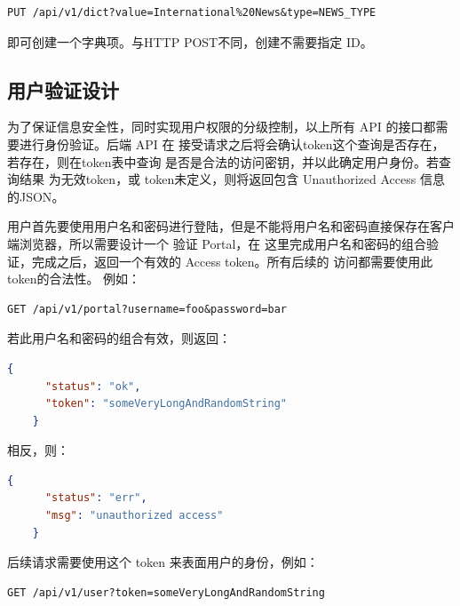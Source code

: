 \documentclass[a4paper, 12pt]{article}
\begin{document}
	\begin{lstlisting}[language=HTTP, basicstyle=\small\lstfont, showstringspaces=false]
	PUT /api/v1/dict?value=International%20News&type=NEWS_TYPE
	\end{lstlisting}

	即可创建一个字典项。与{\inlinecode HTTP POST}不同，创建不需要指定 ID。

	\subsection{\normalfont 用户验证设计}

	为了保证信息安全性，同时实现用户权限的分级控制，以上所有 API 的接口都需要进行身份验证。后端 API 在
	接受请求之后将会确认{\inlinecode token}这个查询是否存在，若存在，则在{\inlinecode token}表中查询
	是否是合法的访问密钥，并以此确定用户身份。若查询结果 为无效{\inlinecode token}，或
	{\inlinecode token}未定义，则将返回包含 Unauthorized Access 信息的{\inlinecode JSON}。

	用户首先要使用用户名和密码进行登陆，但是不能将用户名和密码直接保存在客户端浏览器，所以需要设计一个
	验证 Portal，在 这里完成用户名和密码的组合验证，完成之后，返回一个有效的 Access token。所有后续的
	访问都需要使用此{\inlinecode token}的合法性。 例如：

	\begin{lstlisting}[language=HTTP, basicstyle=\small\lstfont, showstringspaces=false]
	GET /api/v1/portal?username=foo&password=bar
	\end{lstlisting}

	若此用户名和密码的组合有效，则返回：

	\begin{lstlisting}[language=json, basicstyle=\small\lstfont, showstringspaces=false]
	{
	  "status": "ok",
	  "token": "someVeryLongAndRandomString"
	}
	\end{lstlisting}

	相反，则：

	\begin{lstlisting}[language=json, basicstyle=\small\lstfont, showstringspaces=false]
	{
	  "status": "err",
	  "msg": "unauthorized access"
	}
	\end{lstlisting}

	后续请求需要使用这个 token 来表面用户的身份，例如：

	\begin{lstlisting}[language=HTTP, basicstyle=\small\lstfont, showstringspaces=false]
	GET /api/v1/user?token=someVeryLongAndRandomString
	\end{lstlisting}
\end{document}
